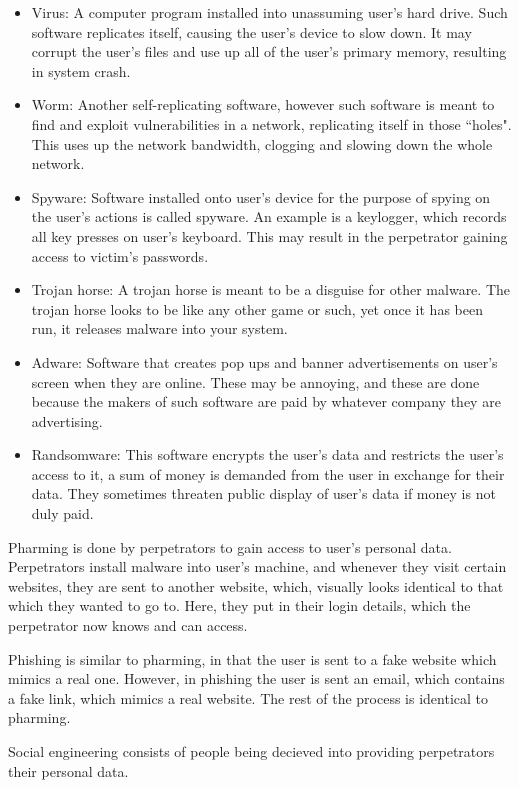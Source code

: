 \begin{itemize}
	\item Virus: A computer program installed into unassuming user's hard drive. Such software
		replicates itself, causing the user's device to slow down. It may corrupt the user's
		files and use up all of the user's primary memory, resulting in system crash.
	\item Worm: Another self-replicating software, however such software is meant to find and
		exploit vulnerabilities in a network, replicating itself in those ``holes". This uses
		up the network bandwidth, clogging and slowing down the whole network.
	\item Spyware: Software installed onto user's device for the purpose of spying on the user's
		actions is called spyware. An example is a keylogger, which records all key presses on
		user's keyboard. This may result in the perpetrator gaining access to victim's passwords.
	\item Trojan horse: A trojan horse is meant to be a disguise for other malware. The trojan
		horse looks to be like any other game or such, yet once it has been run, it releases
		malware into your system.
	\item Adware: Software that creates pop ups and banner advertisements on user's screen when
		they are online. These may be annoying, and these are done because the makers of such
		software are paid by whatever company they are advertising.
	\item Randsomware: This software encrypts the user's data and restricts the user's access to 
		it, a sum of money is demanded from the user in exchange for their data. They sometimes
		threaten public display of user's data if money is not duly paid.
\end{itemize}
Pharming is done by perpetrators to gain access to user's personal data. Perpetrators install
malware into user's machine, and whenever they visit certain websites, they are sent to another
website, which, visually looks identical to that which they wanted to go to. Here, they put in
their login details, which the perpetrator now knows and can access.

Phishing is similar to pharming, in that the user is sent to a fake website which mimics a real 
one. However, in phishing the user is sent an email, which contains a fake link, which mimics a
real website. The rest of the process is identical to pharming.

Social engineering consists of people being decieved into providing perpetrators their personal
data.

